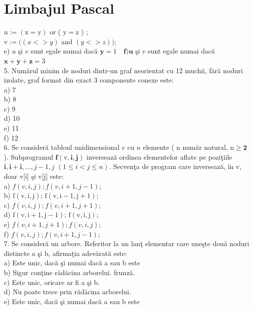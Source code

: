 \documentclass[10pt]{article}
\begin{document}
\section*{Limbajul Pascal}
$\mathrm{u}:=(\mathrm{x}=\mathrm{y})$ or ( $\mathrm{y}=\mathrm{z}$ ) ;\\
$\mathrm{v}:=((x<>y)$ and $(y<>z))$;\\
e) $u$ şi $v$ sunt egale numai dacă $\mathbf{y}=1 \quad \mathbf{f}) \mathbf{u}$ şi $v$ sunt egale numai dacă $\mathbf{x}+\mathbf{y}+\mathbf{z}=3$\\
5. Numărul minim de noduri dintr-un graf neorientat cu 12 muchii, fără noduri izolate, graf format din exact 3 componente conexe este:\\
a) 7\\
b) 8\\
c) 9\\
d) 10\\
e) 11\\
f) 12\\
6. Se consideră tabloul unidimensional $v$ cu $n$ elemente ( n număr natural, $\mathrm{n} \geq \mathbf{2}$ ). Subprogramul $\mathbf{f}(\mathrm{v}, \mathbf{i}, \mathbf{j})$ inversează ordinea elementelor aflate pe poziţiile $\mathbf{i}, \mathbf{i + i}, \ldots, j-1, j$ $(1 \leq i<j \leq n)$. Secvenţa de program care inversează, în v, doar v[i] şi v[j] este:\\
a) $f(v, i, j) ; f(v, i+1, j-1)$;\\
b) $\mathrm{f}(\mathrm{v}, \mathrm{i}, \mathrm{j})$; $\mathrm{f}(\mathrm{v}, \mathrm{i}-1, \mathrm{j}+1)$;\\
c) $f(v, i, j) ; f(v, i+1, j+1)$;\\
d) $\mathrm{f}(\mathrm{v}, \mathrm{i}+1, \mathrm{j}-1)$; $\mathrm{f}(\mathrm{v}, \mathrm{i}, \mathrm{j})$;\\
e) $f(v, i+1, j+1) ; f(v, i, j)$;\\
f) $f(v, i, j) ; f(v, i+1, j-1)$;\\
7. Se consideră un arbore. Referitor la un lanţ elementar care uneşte două noduri distincte a şi b, afirmaţia adevărată este:\\
a) Este unic, dacă şi numai dacă a sau b este\\
b) Sigur conţine rădăcina arborelui. frunză.\\
c) Este unic, oricare ar fi a şi b.\\
d) Nu poate trece prin rădăcina arborelui.\\
e) Este unic, dacă şi numai dacă a sau b este\\
\end{document}
